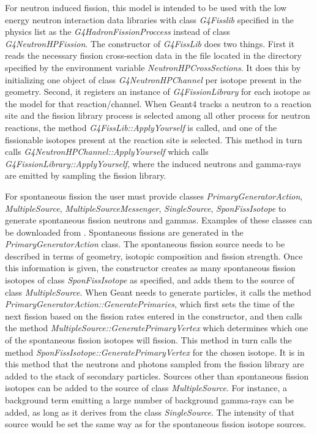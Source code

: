 
For neutron induced fission, this model is intended to be used with
the low energy neutron interaction data libraries with class
\textit{G4Fisslib} specified in the physics list as the
\textit{G4HadronFissionProccess} instead of class
\textit{G4NeutronHPFission}.
The constructor of \textit{G4FissLib}
does two things. First it reads the necessary fission cross-section
data in the file located in the directory specified by the environment
variable \textit{NeutronHPCrossSections}. It does this by initializing
one object of class \textit{G4NeutronHPChannel} per isotope present in
the geometry. Second, it registers an instance of
\textit{G4FissionLibrary} for each isotope as the model for that
reaction/channel. When Geant4 tracks a neutron to a reaction site and
the fission library process is selected among all other process for
neutron reactions, the method \textit{G4FissLib::ApplyYourself} is
called, and one of the fissionable isotopes present at the reaction
site is selected. This method in turn calls
\textit{G4NeutronHPChannel::ApplyYourself} which calls
\textit{G4FissionLibrary::ApplyYourself}, where the induced neutrons
and gamma-rays are emitted by sampling the fission library.

For spontaneous fission the user must provide classes {\it
PrimaryGeneratorAction}, {\it MultipleSource}, {\it
MultipleSourceMessenger}, {\it SingleSource}, {\it SponFissIsotope} to
generate spontaneous fission neutrons and gammas. Examples of these
classes can be downloaded from \httpnuclear. Spontaneous fissions are
generated in the {\it PrimaryGeneratorAction} class.
The spontaneous fission
source needs to be described in terms of geometry, isotopic
composition and fission strength. Once this information is given, the
constructor creates as many spontaneous fission isotopes of class {\it
SponFissIsotope} as specified, and adds them to the source of class
{\it MultipleSource}. When Geant needs to generate particles, it calls
the method {\it PrimaryGeneratorAction::GeneratePrimaries}, which
first sets the time of the next fission based on the fission rates
entered in the constructor, and then calls the method {\it
MultipleSource::GeneratePrimaryVertex} which determines which one of
the spontaneous fission isotopes will fission. This method in turn
calls the method {\it SponFissIsotope::GeneratePrimaryVertex} for the
chosen isotope. It is in this method that the neutrons and photons
sampled from the fission library are added to the stack of secondary
particles.  Sources other than spontaneous fission isotopes can be
added to the source of class {\it MultipleSource}. For instance, a
background term emitting a large number of background gamma-rays can
be added, as long as it derives from the class {\it SingleSource}. The
intensity of that source would be set the same way as for the
spontaneous fission isotope sources.

